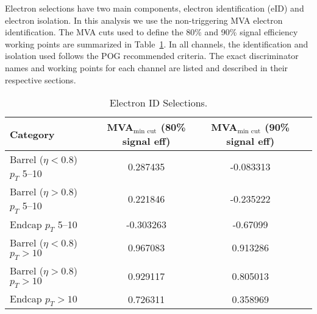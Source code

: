 Electron selections have two main components, electron  identification (eID) and electron isolation. 
In this analysis we use the non-triggering MVA electron identification. 
The MVA cuts used to define the 80\% and 90\% signal efficiency working points are summarized in Table~\ref{eIDtable}. 
In all channels, the identification and isolation used follows the POG recommended criteria. 
The exact discriminator names and working points for each channel are listed and described in their respective sections.

\begin{table}[ht]
\begin{center}
 \caption{Electron ID Selections.\label{eIDtable}}
 \begin{tabular}{| l | c | c | c |}
 \hline\hline
       Category                              & MVA$_{\textrm{min cut}}$ (80\% signal eff)	& MVA$_{\textrm{min cut}}$ (90\% signal eff)  \\[0.5ex] \hline
       Barrel ($\eta < 0.8$) $p_{T}$ 5--10           	& 0.287435 & -0.083313             	\\
       Barrel ($\eta > 0.8$) $p_{T}$ 5--10           	& 0.221846 & -0.235222             	\\
       Endcap $p_{T}$ 5--10           			& -0.303263 & -0.67099             	\\
       Barrel ($\eta < 0.8$) $p_{T}>10$            	& 0.967083 & 0.913286             	\\
       Barrel ($\eta > 0.8$) $p_{T}>10$            	& 0.929117 & 0.805013             	\\
       Endcap $p_{T}>10$          		  	& 0.726311 & 0.358969             	\\
 \hline
 \hline
 \end{tabular}
\end{center}
\end{table}
